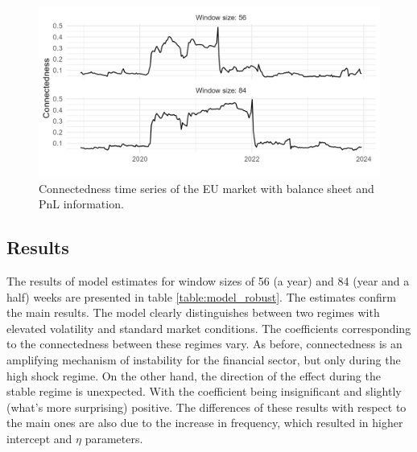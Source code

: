 \documentclass[12pt]{article}
\begin{document}
\begin{figure}
	\centering
	\includegraphics[scale = 0.9]{img/connect_bs.png}
	\caption{Connectedness time series of the EU market with balance sheet and PnL information.}
	\label{figure:connect_bs}
\end{figure}

\subsection{Results}

The results of model estimates for window sizes of 56 (a year) and 84 (year and a half) weeks are presented in table \ref{table:model_robust}. The estimates confirm the main results. The model clearly distinguishes between two regimes with elevated volatility and standard market conditions. The coefficients corresponding to the connectedness between these regimes vary. As before, connectedness is an amplifying mechanism of instability for the financial sector, but only during the high shock regime. On the other hand, the direction of the effect during the stable regime is unexpected. With the coefficient being insignificant and slightly (what's more surprising) positive. The differences of these results with respect to the main ones are also due to the increase in frequency, which resulted in higher intercept and $\eta$ parameters.  
\end{document}
